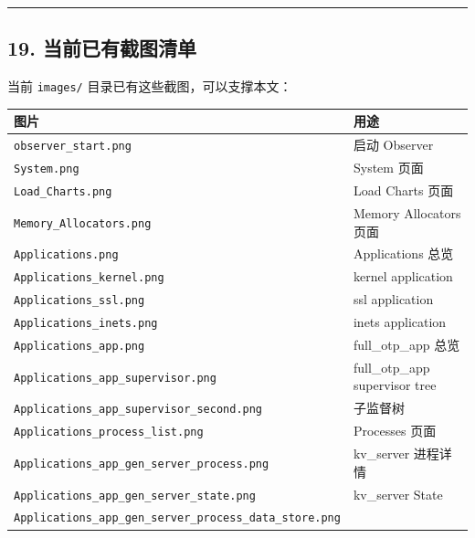 \begin{center}\rule{0.5\linewidth}{0.5pt}\end{center}

\subsection{19.
当前已有截图清单}\label{ux5f53ux524dux5df2ux6709ux622aux56feux6e05ux5355}

当前 \texttt{images/} 目录已有这些截图，可以支撑本文：

\begin{longtable}[]{@{}
  >{\raggedright\arraybackslash}p{}
  >{\raggedright\arraybackslash}p{}@{}}
\toprule\noalign{}
\begin{minipage}[b]{\linewidth}\raggedright
图片
\end{minipage} & \begin{minipage}[b]{\linewidth}\raggedright
用途
\end{minipage} \\
\midrule\noalign{}
\endhead
\bottomrule\noalign{}
\endlastfoot
\texttt{observer\_start.png} & 启动 Observer \\
\texttt{System.png} & System 页面 \\
\texttt{Load\_Charts.png} & Load Charts 页面 \\
\texttt{Memory\_Allocators.png} & Memory Allocators 页面 \\
\texttt{Applications.png} & Applications 总览 \\
\texttt{Applications\_kernel.png} & kernel application \\
\texttt{Applications\_ssl.png} & ssl application \\
\texttt{Applications\_inets.png} & inets application \\
\texttt{Applications\_app.png} & full\_otp\_app 总览 \\
\texttt{Applications\_app\_supervisor.png} & full\_otp\_app supervisor
tree \\
\texttt{Applications\_app\_supervisor\_second.png} & 子监督树 \\
\texttt{Applications\_process\_list.png} & Processes 页面 \\
\texttt{Applications\_app\_gen\_server\_process.png} & kv\_server
进程详情 \\
\texttt{Applications\_app\_gen\_server\_state.png} & kv\_server State \\
\texttt{Applications\_app\_gen\_server\_process\_data\_store.png} &

\end{longtable}
